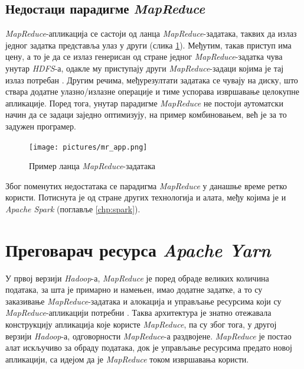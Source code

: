 \documentclass[12pt,oneside]{memoir}
\begin{document}

\subsection{Недостаци парадигме \textit{MapReduce}}
\label{subsec:nedost_mr}

\textit{MapReduce}-апликација се састоји од ланца \textit{MapReduce}-задатака, таквих да излаз једног задатка представља улаз у други (слика \ref{fig:mr_app_example}). Међутим, такав приступ има цену, а то је да се излаз генерисан од стране једног \textit{MapReduce}-задатка чува унутар \textit{HDFS}-а, одакле му приступају други \textit{MapReduce}-задаци којима је тај излаз потребан \cite{hadoop_learning}. Другим речима, међурезултати задатака се чувају на диску, што ствара додатне улазно/излазне операције и тиме успорава извршавање целокупне апликације. Поред тога, унутар парадигме \textit{MapReduce} не постоји аутоматски начин да се задаци заједно оптимизују, на пример комбиновањем, већ је за то задужен програмер.

\begin{figure}[!ht]
  \centering
  \texttt{[image: pictures/mr\_app.png]}
  \caption{Пример ланца \textit{MapReduce}-задатака}
  \label{fig:mr_app_example}
\end{figure}

Због поменутих недостатака се парадигма \textit{MapReduce} у данашње време ретко користи. Потиснута је од стране других технологија и алата, међу којима је и \textit{Apache Spark}  (поглавље \ref{chp:spark}).

\section{Преговарач ресурса \textit{Apache Yarn}}
\label{sec:yarn}

У првој верзији \textit{Hadoop}-а, \textit{MapReduce} је поред обраде великих количина података, за шта је примарно и намењен, имао додатне задатке, а то су заказивање \textit{MapReduce}-задатака и алокација и управљање ресурсима који су \textit{MapReduce}-апликацији потребни \cite{hadoop_learning}. Таква архитектура је знатно отежавала конструкцију апликација које користе \textit{MapReduce}, па су због тога, у другој верзији \textit{Hadoop}-а, одговорности \textit{MapReduce}-а раздвојене. \textit{MapReduce} је постао алат искључиво за обраду података, док је управљање ресурсима предато новој апликацији, са идејом да је \textit{MapReduce} током извршавања користи.
\end{document}
